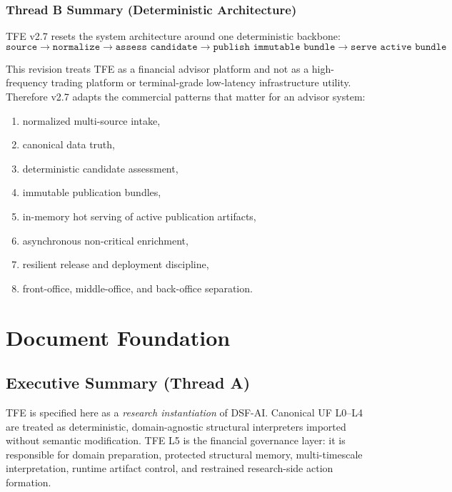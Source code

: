 \documentclass[11pt]{report}
\begin{document}
\section*{Thread B Summary (Deterministic Architecture)}
TFE v2.7 resets the system architecture around one deterministic backbone:
\[
\texttt{source} \rightarrow \texttt{normalize} \rightarrow \texttt{assess candidate} \rightarrow \texttt{publish immutable bundle} \rightarrow \texttt{serve active bundle}
\]

This revision treats TFE as a financial advisor platform and not as a high-frequency trading platform or terminal-grade low-latency infrastructure utility. Therefore v2.7 adapts the commercial patterns that matter for an advisor system:
\begin{enumerate}[leftmargin=1.2cm]
    \item normalized multi-source intake,
    \item canonical data truth,
    \item deterministic candidate assessment,
    \item immutable publication bundles,
    \item in-memory hot serving of active publication artifacts,
    \item asynchronous non-critical enrichment,
    \item resilient release and deployment discipline,
    \item front-office, middle-office, and back-office separation.
\end{enumerate}

\clearpage

\part{Document Foundation}

\chapter*{Executive Summary (Thread A)}
TFE is specified here as a \emph{research instantiation} of DSF-AI. Canonical UF L0--L4 are treated as deterministic, domain-agnostic structural interpreters imported without semantic modification. TFE L5 is the financial governance layer: it is responsible for domain preparation, protected structural memory, multi-timescale interpretation, runtime artifact control, and restrained research-side action formation.
\end{document}
